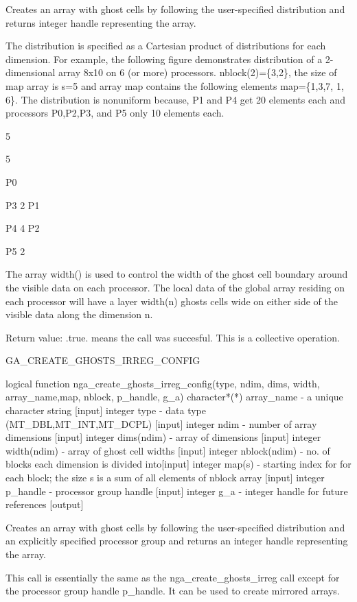 Creates an array with ghost cells by following the user-specified
distribution and returns integer handle representing the array.

The distribution is specified as a Cartesian product of distributions
for each dimension. For example, the following figure demonstrates
distribution of a 2-dimensional array 8x10 on 6 (or more) processors.
nblock(2)=\{3,2\}, the size of map array is s=5 and array map contains
the following elements map=\{1,3,7, 1, 6\}. The distribution is nonuniform
because, P1 and P4 get 20 elements each and processors P0,P2,P3, and
P5 only 10 elements each. 

5 

5 

P0 

P3 2 P1 

P4 4 P2 

P5 2

The array width() is used to control the width of the ghost cell boundary
around the visible data on each processor. The local data of the global
array residing on each processor will have a layer width(n) ghosts
cells wide on either side of the visible data along the dimension
n.

Return value: .true. means the call was succesful. This is a collective
operation.

GA\_CREATE\_GHOSTS\_IRREG\_CONFIG

logical function nga\_create\_ghosts\_irreg\_config(type, ndim, dims,
width, array\_name,map, nblock, p\_handle, g\_a) character{*}({*})
array\_name - a unique character string {[}input{]} integer type -
data type (MT\_DBL,MT\_INT,MT\_DCPL) {[}input{]} integer ndim - number
of array dimensions {[}input{]} integer dims(ndim) - array of dimensions
{[}input{]} integer width(ndim) - array of ghost cell widths {[}input{]}
integer nblock(ndim) - no. of blocks each dimension is divided into{[}input{]}
integer map(s) - starting index for for each block; the size s is
a sum of all elements of nblock array {[}input{]} integer p\_handle
- processor group handle {[}input{]} integer g\_a - integer handle
for future references {[}output{]}

Creates an array with ghost cells by following the user-specified
distribution and an explicitly specified processor group and returns
an integer handle representing the array.

This call is essentially the same as the nga\_create\_ghosts\_irreg
call except for the processor group handle p\_handle. It can be used
to create mirrored arrays.

